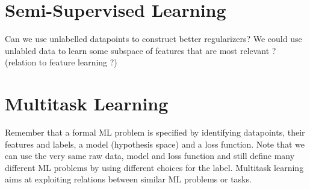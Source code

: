 \documentclass[12pt]{report}
\begin{document}

\section{Semi-Supervised Learning} 
\label{sec_ssl_regularization}
Can we use unlabelled datapoints to construct better regularizers? We could use unlabled data 
to learn some subspace of features that are most relevant ? (relation to feature learning ?)

\section{Multitask Learning} 
\label{sec_mtl_regularization}
Remember that a formal ML problem is specified by identifying 
datapoints, their features and labels, a model (hypothesis space)
and a loss function. Note that we can use the very same raw data, model 
and loss function and still define many different ML problems by 
using different choices for the label. Multitask learning aims at 
exploiting relations between similar ML problems or tasks. 
\end{document}
